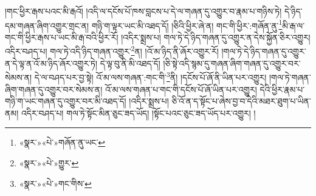 །གང་ཕྱིར་རྒས་པའང་མི་རྒའོ། །འདི་ལ་དངོས་པོ་ཁས་བླངས་པ་དེ་ལ་གཞན་དུ་འགྱུར་བ་རྣམ་པ་གཉིས་ཏེ། དེ་ཉིད་དམ་གཞན་ཞིག་འགྱུར་གྲང་ན། གཉི་ག་ལྟར་ཡང་མི་འཐད་དོ། །ཅིའི་ཕྱིར་ཞེ་ན། གང་གི་ཕྱིར་:གཞོན་ནུ་\footnote{«སྣར་»«པེ་»གཞོན་ནུ་ཡང་}མི་རྒ་ལ་གང་གི་ཕྱིར་རྒས་པ་ཡང་མི་རྒ་བའི་ཕྱིར་རོ། །འདིར་སྨྲས་པ། གལ་ཏེ་དེ་ཉིད་གཞན་དུ་འགྱུར་ན་དེས་སྐྱོན་ཅིར་འགྱུར། འདིར་བཤད་པ། གལ་ཏེ་འདི་ཉིད་གཞན་འགྱུར་\footnote{«སྣར་»«པེ་»གྱུར་}ན། །འོ་མ་ཉིད་ནི་ཞོར་འགྱུར་རོ། །གལ་ཏེ་དེ་ཉིད་གཞན་དུ་འགྱུར་ན་དེ་ལྟ་ན་འོ་མ་ཉིད་ཞོར་འགྱུར་ཏེ། དེ་ལྟ་བུ་ནི་མི་འཐད་དོ། །ཅི་སྟེ་འདི་སྙམ་དུ་གཞན་ཞིག་གཞན་དུ་འགྱུར་བར་སེམས་ན། དེ་ལ་བཤད་པར་བྱ་སྟེ། འོ་མ་ལས་གཞན་:གང་གི་\footnote{«སྣར་»«པེ་»གང་གིས་}ནི། །དངོས་པོ་ཞོ་ནི་ཡིན་པར་འགྱུར། །གལ་ཏེ་གཞན་ཞིག་གཞན་དུ་འགྱུར་བར་སེམས་ན། འོ་མ་ལས་གཞན་པ་གང་གི་དངོས་པོ་ཞོ་ཡིན་པར་འགྱུར། དེའི་ཕྱིར་རྣམ་པ་གཉི་ག་ཡང་གཞན་དུ་འགྱུར་བར་མི་འཐད་དོ། །འདིར་སྨྲས་པ། ཅི་འོ་ན་ད་སྟོང་པ་ཞེས་བྱ་བ་དེའི་མཐར་ཐུག་པ་ཡིན་ནམ། འདིར་བཤད་པ། གལ་ཏེ་སྟོང་མིན་ཅུང་ཟད་ཡོད། །སྟོང་པའང་ཅུང་ཟད་ཡོད་པར་འགྱུར། །
